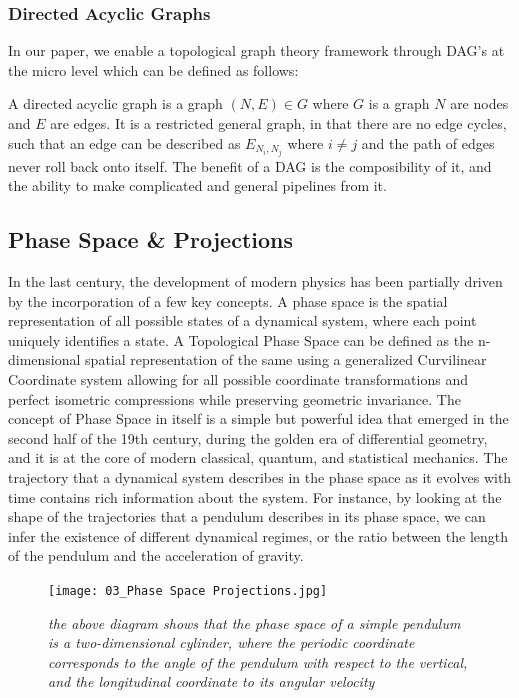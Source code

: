\subsubsection{Directed Acyclic Graphs}
In our paper, we enable a topological graph theory framework through DAG's at the micro level which can be defined as follows:

A directed acyclic graph is a graph $(N,E) \in G$ where $G$ is a graph $N$ are nodes and $E$ are edges. It is a restricted general graph, in that there are no edge cycles, such that an edge can be described as $E_{N_i,N_j}$ where $i \ne j$ and the path of edges never roll back onto itself. The benefit of a DAG is the composibility of it, and the ability to make complicated and general pipelines from it.

\subsection{Phase Space \& Projections}
In the last century, the development of modern physics has been partially driven by the incorporation of a few key concepts. A phase space is the spatial representation of all possible states of a dynamical system, where each point uniquely identifies a state. A Topological Phase Space can be defined as the n-dimensional spatial representation of the same using a generalized Curvilinear Coordinate system allowing for all possible coordinate transformations and perfect isometric compressions while preserving geometric invariance.
The concept of Phase Space in itself is a simple but powerful idea that emerged in the second half of the 19th century, during the golden era of differential geometry, and it is at the core of modern classical, quantum, and statistical mechanics. The trajectory that a dynamical system describes in the phase space as it evolves with time contains rich information about the system. For instance, by looking at the shape of the trajectories that a pendulum describes in its phase space, we can infer the existence of different dynamical regimes, or the ratio between the length of the pendulum and the acceleration of gravity.

\begin{figure}[H]
	\centering
	\texttt{[image: 03\_Phase Space Projections.jpg]}
	\caption{\textit{the above diagram shows that the phase space of a simple pendulum is a two-dimensional cylinder, where the periodic coordinate corresponds to the angle  of the pendulum with respect to the vertical, and the longitudinal coordinate to its angular velocity}}
	\label{fig:fig2}
\end{figure}


